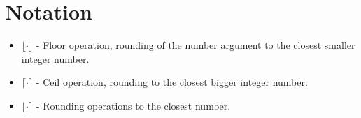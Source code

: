 \chapter*{Notation}

\begin{itemize}
\item $\lfloor \cdot \rfloor$ - Floor operation, rounding of the number argument to the closest smaller integer number.
\item $\lceil \cdot \rceil$ - Ceil operation, rounding to the closest bigger integer number.
\item $\lfloor \cdot \rceil$ - Rounding operations to the closest number.
\end{itemize}